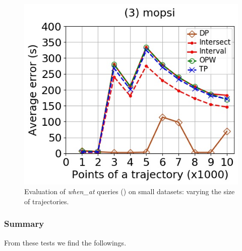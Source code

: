 {\begin{figure}[tb!]
	\includegraphics[scale=0.350]{Figures/Exp-when-DAD-error-size-mopsi.jpg}	
	\vspace{-2ex}
	\caption{\small {Evaluation of \emph{when\_at} queries (\dad) on small datasets: varying the size of trajectories.}}
	\label{fig:query-when-dad-size}
	\vspace{-1ex}
\end{figure}



\subsubsection{Summary}
\label{sec-exp-summary}
From these tests we find the followings.

}
